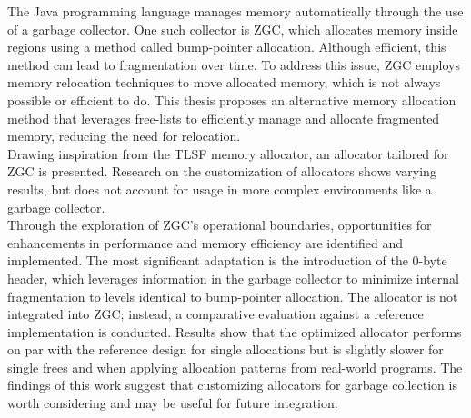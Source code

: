 
The Java programming language manages memory automatically through the use of a garbage collector. One such collector is ZGC, which allocates memory inside regions using a method called bump-pointer allocation. Although efficient, this method can lead to fragmentation over time. To address this issue, ZGC employs memory relocation techniques to move allocated memory, which is not always possible or efficient to do. This thesis proposes an alternative memory allocation method that leverages free-lists to efficiently manage and allocate fragmented memory, reducing the need for relocation.\\

Drawing inspiration from the TLSF memory allocator, an allocator tailored for ZGC is presented. Research on the customization of allocators shows varying results, but does not account for usage in more complex environments like a garbage collector.\\

Through the exploration of ZGC's operational boundaries, opportunities for enhancements in performance and memory efficiency are identified and implemented. The most significant adaptation is the introduction of the 0-byte header, which leverages information in the garbage collector to minimize internal fragmentation to levels identical to bump-pointer allocation. The allocator is not integrated into ZGC; instead, a comparative evaluation against a reference implementation is conducted. Results show that the optimized allocator performs on par with the reference design for single allocations but is slightly slower for single frees and when applying allocation patterns from real-world programs. The findings of this work suggest that customizing allocators for garbage collection is worth considering and may be useful for future integration.\\

